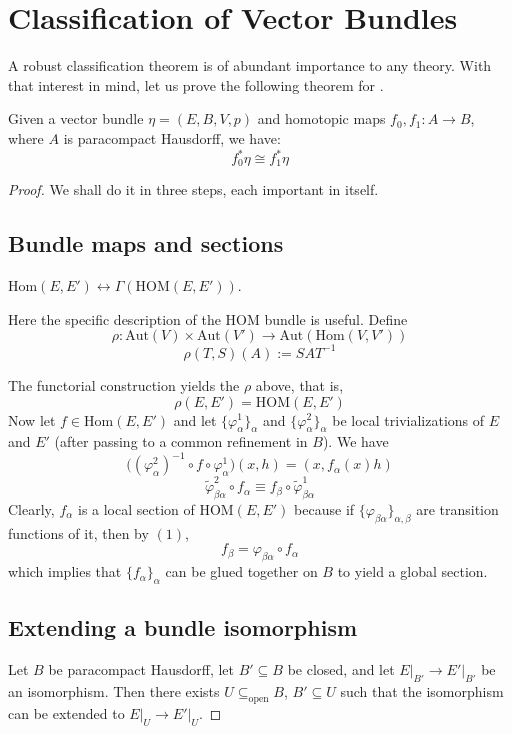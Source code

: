 \documentclass[11pt,a4paper]{article}
\begin{document}
\section*{Classification of Vector Bundles}
A robust classification theorem is of abundant importance to any theory. With that interest in mind, let us prove the following theorem for .
\begin{theorem}
    Given a vector bundle $\eta=(E,B,V,p)$ and homotopic maps $f_0,f_1:A\to B$, where $A$ is paracompact Hausdorff, we have:
    $$f_0^*\eta \cong f_1^*\eta$$
\end{theorem}

\begin{proof}
    We shall do it in three steps, each important in itself.

    \subsection*{Bundle maps and sections} $\text{Hom}(E, E') \longleftrightarrow \Gamma(\text{HOM}(E, E'))$.

    Here the specific description of the HOM bundle is useful. Define
    $$\rho: \text{Aut}(V)\times \text{Aut}(V')\rightarrow \text{Aut}(\text{Hom}(V, V'))$$
    \begin{equation}\tag{1}
        \rho(T, S)(A) := SAT^{-1}
    \end{equation}

The functorial construction yields the $\rho$ above, that is,
$$\rho(E, E') = \text{HOM}(E, E')$$
Now let $f\in \text{Hom}(E, E')$ and let $\{\varphi^1_{\alpha}\}_{\alpha}$ and $\{\varphi^2_{\alpha}\}_{\alpha}$ be local trivializations of $E$ and $E'$ (after passing to a common refinement in $B$). We have
$$\big((\varphi^2_{\alpha})^{-1}\circ f
\circ \varphi^1_{\alpha}\big)(x, h) = (x, f_{\alpha}(x)h)$$
$$\widetilde{\varphi}^2_{\beta\alpha}\circ f_{\alpha} \equiv f_{\beta}\circ \widetilde{\varphi}^1_{\beta\alpha}$$
Clearly, $f_{\alpha}$ is a local section of HOM$(E, E')$ because if $\{\varphi_{\beta\alpha}\}_{\alpha, \beta}$ are transition functions of it, then by $(1)$,
$$f_{\beta} = \varphi_{\beta\alpha}\circ f_{\alpha}$$
which implies that $\{f_{\alpha}\}_{\alpha}$ can be glued together on $B$ to yield a global section.

\subsection*{Extending a bundle isomorphism} Let $B$ be paracompact Hausdorff, let $B'\subseteq B$ be closed, and let $E\big|_{B'} \rightarrow E'\big|_{B'}$ be an isomorphism. Then there exists $U\subseteq_{\text{open}} B$, $B'\subseteq U$ such that the isomorphism can be extended to $E\big|_{U} \rightarrow E'\big|_{U}$.


\end{proof}
\end{document}
